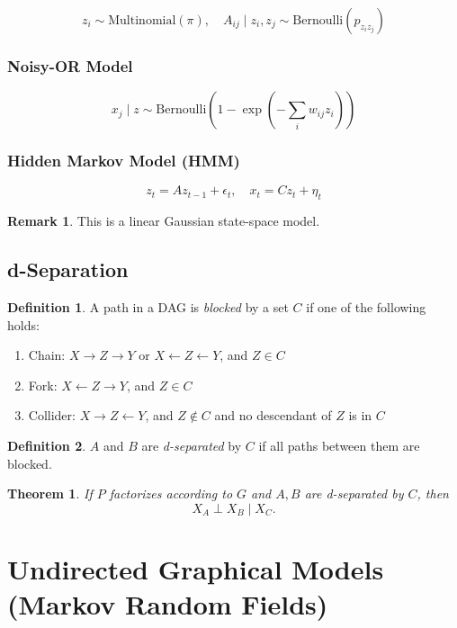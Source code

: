 \documentclass[12pt,oneside]{book}
\numberwithin{equation}{section}
\theoremstyle{definition}
\newtheorem{definition}{Definition}[section]
\newtheorem{remark}{Remark}[section]
\theoremstyle{plain}
\newtheorem{theorem}{Theorem}[section]
\theoremstyle{remark}
\begin{document}
\[
z_i \sim \mathrm{Multinomial}(\pi), \quad
A_{ij} \mid z_i,z_j \sim \mathrm{Bernoulli}(p_{z_i z_j})
\]

\subsubsection{Noisy-OR Model}

\[
x_j \mid z \sim \mathrm{Bernoulli}\left(1 - \exp\left(-\sum_i w_{ij} z_i\right)\right)
\]

\subsubsection{Hidden Markov Model (HMM)}

\[
z_t = A z_{t-1} + \epsilon_t, \quad
x_t = C z_t + \eta_t
\]

\begin{remark}
This is a linear Gaussian state-space model.
\end{remark}


\subsection{d-Separation}

\begin{definition}
A path in a DAG is \emph{blocked} by a set $C$ if one of the following holds:
\begin{enumerate}
\item Chain: $X \to Z \to Y$ or $X \leftarrow Z \leftarrow Y$, and $Z \in C$
\item Fork: $X \leftarrow Z \to Y$, and $Z \in C$
\item Collider: $X \to Z \leftarrow Y$, and $Z \notin C$ and no descendant of $Z$ is in $C$
\end{enumerate}
\end{definition}

\begin{definition}
$A$ and $B$ are \emph{d-separated} by $C$ if all paths between them are blocked.
\end{definition}

\begin{theorem}
If $P$ factorizes according to $G$ and $A,B$ are d-separated by $C$, then
\[
X_A \perp X_B \mid X_C.
\]
\end{theorem}


\section{Undirected Graphical Models (Markov Random Fields)}
\end{document}
